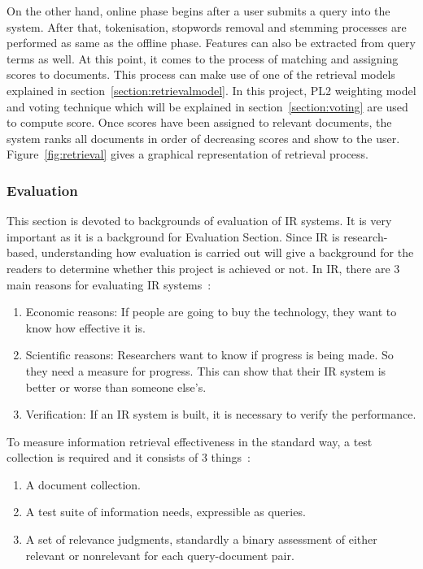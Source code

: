 
On the other hand, online phase begins after a user submits a query into the system. After that, tokenisation, stopwords removal and stemming processes 
are performed as same as the offline phase.
Features can also be extracted from query terms as well. At this point, it comes to the process of matching and assigning scores to documents.
This process can make use of one of the retrieval models explained in section~\ref{section:retrievalmodel}. In this project, PL2 weighting model and voting
technique which will be explained in section~\ref{section:voting} are used to compute score.
Once scores have been assigned to relevant documents, the system ranks all documents in order of decreasing scores and 
show to the user. Figure~\ref{fig:retrieval} gives a graphical representation of retrieval process.

\subsubsection{Evaluation}\label{sec:evaluation}
This section is devoted to backgrounds of evaluation of IR systems. It is very important as it is a background for Evaluation Section. 
Since IR is research-based, understanding how evaluation is carried out will give a background for the readers to determine whether 
this project is achieved or not. In IR, there are 3 main reasons for evaluating IR systems~\cite[P. 3]{eval}: 
\begin{enumerate}
 \item Economic reasons: If people are going to buy the technology, they want to know how effective it is.
 \item Scientific reasons: Researchers want to know if progress is being made. So they need a measure for progress. 
	This can show that their IR system is better or worse than someone else's.
 \item Verification: If an IR system is built, it is necessary to verify the performance.
\end{enumerate}

To measure information retrieval effectiveness in the standard way, a test collection is required and it consists of 3 things~\cite{evalweb}:
\begin{enumerate}
 \item A document collection.
 \item A test suite of information needs, expressible as queries.
 \item A set of relevance judgments, standardly a binary assessment of either relevant or nonrelevant for each query-document pair.
\end{enumerate}

